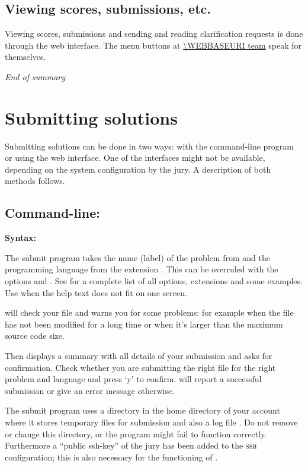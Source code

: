 \subsection*{Viewing scores, submissions, etc.}

Viewing scores, submissions and sending and reading clarification
requests is done through the web interface. The menu buttons at
\url{\WEBBASEURI team} speak for themselves.

\emph{End of summary}

\newpage

\section{Submitting solutions}\label{submit}

Submitting solutions can be done in two ways: with the command-line
program  or using the web interface. One of the
interfaces might not be available, depending on the system
configuration by the jury. A description of both methods follows.

\subsection{Command-line: }

\textbf{Syntax:} 

The submit program takes the name (label) of the problem from
 and the programming language from the extension
. This can be overruled with the options
 and .
See  for a complete list of all options,
extensions and some examples.  Use 
when the help text does not fit on one screen.

 will check your file and warns you for some problems:
for example when the file has not been modified for a long time or
when it's larger than the maximum source code size.

Then  displays a summary with all details of your
submission and asks for confirmation. Check whether you are submitting
the right file for the right problem and language and press `y' to
confirm.  will report a successful submission or give
an error message otherwise.

The submit program uses a directory \cmd{\USERSUBMITDIR} in the
home directory of your account where it stores temporary files for
submission and also a log file . Do not remove or
change this directory, or the  program might fail to
function correctly. Furthermore a ``public ssh-key'' of the jury has
been added to the \textsc{ssh} configuration; this is also necessary
for the functioning of .

